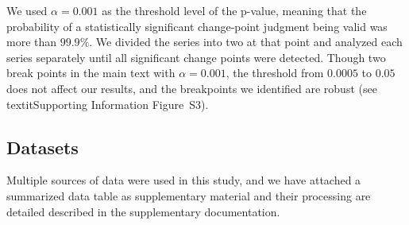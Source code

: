 		We used $\alpha = 0.001$ as the threshold level of the p-value, meaning that the probability of a statistically significant change-point judgment being valid was more than $99.9\%$. We divided the series into two at that point and analyzed each series separately until all significant change points were detected. Though two break points in the main text with $\alpha = 0.001$, the threshold from $0.0005$ to $0.05$ does not affect our results, and the breakpoints we identified are robust (see \\textit{Supporting Information} Figure~S3).

	\subsection{Datasets}
	Multiple sources of data were used in this study, and we have attached a summarized data table as supplementary material and their processing are detailed described in the supplementary documentation.
